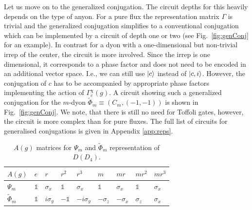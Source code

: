 \documentclass[two column]{article}
\begin{document}
Let us move on to the generalized conjugation. The circuit depths for this heavily depends on the type of anyon. For a pure flux the representation matrix $\Gamma$ is trivial and the generalized conjugation simplifies to a conventional conjugation which can be implemented by a circuit of depth one or two (see Fig.~\ref{fig:genConj} for an example). In contrast for a dyon with a one-dimensional but non-trivial irrep of the center, the circuit is more involved. Since the irrep is one dimensional, it corresponds to a phase factor and does not need to be encoded in an additional vector space. I.e., we can still use $\ket{c}$ instead of $\ket{c,i}$. However, the conjugation of $c$ has to be accompanied by appropriate phase factors implementing the action of $\Gamma^\chi_c(g)$. A circuit showing such a generalized conjugation for the $m$-dyon $\tilde{\Phi}_m \equiv (C_m, (-1, -1))$ is shown in Fig.~\ref{fig:genConj}. We note, that there is still no need for Toffoli gates, however, the circuit is more complex than for pure fluxes. The full list of circuits for generalised conjugations is given in Appendix \ref{app:reps}.

\begin{table}[]
    \centering
    \begin{tabular}{|p{0.5cm}||p{0.25cm}|p{0.5cm}|p{0.5cm}|p{0.6cm}|p{0.5cm}|p{0.5cm}|p{0.5cm}|p{0.5cm}|}
    \hline
  $A{(g)}$ & $e$ &   $r$ & $r^2$ & $r^3$ &  $m$ & $mr$ & $mr^2$ & $mr^3$ \\
\hline\hline
 $\Psi_{m}$ &$\mathbb{1}$&  $\sigma_x$ & $\mathbb{1}$&  $\sigma_x$ & $\mathbb{1}$& $\sigma_x$ &  $\mathbb{1}$&   $\sigma_x$ \\\hline
 $\tilde{\Phi}_{m}$ &$\mathbb{1}$&$i\sigma_y$ &$-\mathbb{1}$& $-i\sigma_y$ &$-\sigma_z$ &$-\sigma_x$ &  $\sigma_z$ &   $\sigma_x$ \\\hline
\end{tabular}
    \caption{$A{(g)}$ matrices for $\Psi_m$ and $\tilde{\Phi}_m$ representation of $D(D_4)$.}
    \label{tab:somereps}
\end{table}
\end{document}

